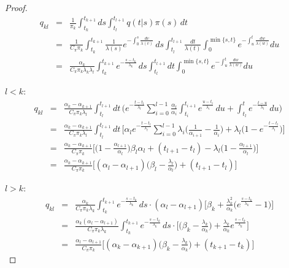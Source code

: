 \documentclass[pdftex,10pt]{article}
\begin{document}
\begin{proof}
\begin{eqnarray*}
  q_{kl}&=&\frac{1}{\pi_k}\int_{t_k}^{t_{k+1}}ds\int_{t_l}^{t_{l+1}}q(t|s)\pi(s)\,dt\\
  &=&\frac{1}{C_{\pi}\pi_k}\int_{t_k}^{t_{k+1}}\frac{1}{\lambda(s)}e^{-\int_0^s\frac{dv}{\lambda(v)}}\,ds
  \int_{t_l}^{t_{l+1}}\frac{dt}{\lambda(t)}\int_0^{\min\{s,t\}}e^{-\int_{u}^{t}\frac{dw}{\lambda(w)}}du\\
  &=&\frac{\alpha_k}{C_{\pi}\pi_k\lambda_k\lambda_l}\int_{t_k}^{t_{k+1}}e^{-\frac{s-t_k}{\lambda_k}}\,ds
  \int_{t_l}^{t_{l+1}}dt\int_0^{\min\{s,t\}}e^{-\int_{u}^{t}\frac{dw}{\lambda(w)}}du
\end{eqnarray*}

$l<k$:
\begin{eqnarray*}
  q_{kl} &=&\frac{\alpha_k-\alpha_{k+1}}{C_{\pi}\pi_k\lambda_l}
  \int_{t_l}^{t_{l+1}}dt\,\Bigg(e^{-\frac{t-t_l}{\lambda_l}}\sum_{i=0}^{l-1}\frac{\alpha_l}{\alpha_i}
  \int_{t_i}^{t_{i+1}}e^{\frac{u-t_i}{\lambda_i}}\,du+\int_{t_l}^{t}e^{-\frac{t-u}{\lambda_l}}\,du\Bigg)\\
  &=&\frac{\alpha_k-\alpha_{k+1}}{C_{\pi}\pi_k\lambda_l}
  \int_{t_l}^{t_{l+1}}dt\,\Bigg[\alpha_le^{-\frac{t-t_l}{\lambda_l}}\sum_{i=0}^{l-1}\lambda_i
  \Big(\frac{1}{\alpha_{i+1}}-\frac{1}{\alpha_i}\Big)+\lambda_l\Big(1-e^{-\frac{t-t_l}{\lambda_l}}\Big)\Bigg]\\
  &=&\frac{\alpha_k-\alpha_{k+1}}{C_{\pi}\pi_k}
  \Big[\Big(1-\frac{\alpha_{l+1}}{\alpha_l}\Big)\beta_l\alpha_l+(t_{l+1}-t_l)-\lambda_l
  \Big(1-\frac{\alpha_{l+1}}{\alpha_l}\Big)\Big]\\
  &=&\frac{\alpha_k-\alpha_{k+1}}{C_{\pi}\pi_k}\Bigg[(\alpha_l-\alpha_{l+1})\Big(\beta_l-\frac{\lambda_l}{\alpha_l}\Big)
  +(t_{l+1}-t_l)\Bigg]
\end{eqnarray*}

$l>k$:
\begin{eqnarray*}
  q_{kl}&=&\frac{\alpha_k}{C_{\pi}\pi_k\lambda_k}\int_{t_k}^{t_{k+1}}e^{-\frac{s-t_k}{\lambda_k}}\,ds\cdot
  (\alpha_l-\alpha_{l+1})\Bigg[\beta_k+\frac{\lambda_k^2}{\alpha_k}\Big(e^{\frac{s-t_k}{\lambda_k}}-1\Big)\Bigg]\\
  &=&\frac{\alpha_k(\alpha_l-\alpha_{l+1})}{C_{\pi}\pi_k\lambda_k}\int_{t_k}^{t_{k+1}}e^{-\frac{s-t_k}{\lambda_k}}\,ds\cdot
  \Bigg[\Big(\beta_k-\frac{\lambda_k}{\alpha_k}\Big)+\frac{\lambda_k}{\alpha_k}e^{\frac{s-t_k}{\lambda_k}}\Bigg]\\
  &=&\frac{\alpha_l-\alpha_{l+1}}{C_{\pi}\pi_k}
  \Bigg[(\alpha_k-\alpha_{k+1})\Big(\beta_k-\frac{\lambda_k}{\alpha_k}\Big)+(t_{k+1}-t_k)\Bigg]
\end{eqnarray*}


\end{proof}
\end{document}
